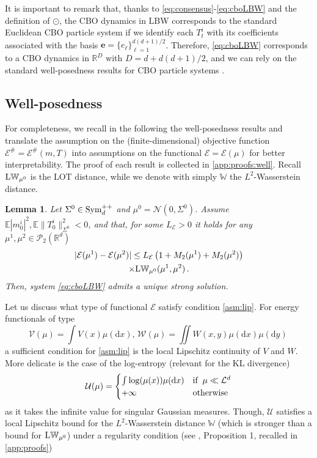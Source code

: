 \documentclass{article}
\theoremstyle{plain}
\newtheorem{lemma}[theorem]{Lemma}
\theoremstyle{definition}
\theoremstyle{remark}
\newcommand{\Rd}{ {\mathbb{R}^d}}
\newcommand{\R}{ \mathbb{R}}
\newcommand{\E}{\mathcal{E}}
\newcommand{\U}{\mathcal{U}}
\renewcommand{\d}{\mathrm{d}}
\newcommand{\pd}{\textup{Sym}^{++}_d}
\newcommand{\W}{\mathbb{W}}
\newcommand{\LW}{\textup{L}\mathbb{W}}
\begin{document}
It is important to remark that, thanks to \eqref{eq:consensus}-\eqref{eq:cboLBW} and the definition of $\odot$, the CBO dynamics in LBW corresponds to the standard Euclidean CBO particle system if we identify each $T^i_t$ with its coefficients associated with the basis $\bm{e} = \{e_\ell\}_{\ell = 1}^{d(d+1)/2}$. Therefore, \eqref{eq:cboLBW} corresponds to a CBO dynamics in $\R^D$ with $D = d + d(d+1)/2$, and we can rely on the standard well-posedness results for CBO particle systems \cite{carrillo2021consensus, carrillo2018analytical}. 


\subsection{Well-posedness}

For completeness, we recall in the following the well-posedness results  and translate the assumption on the (finite-dimensional) objective function $\E^\# = \E^\#(m,T)$ into assumptions on the functional $\E = \E(\mu)$ for better interpretability. The proof of each result is collected in \cref{app:proofs:well}. Recall $\LW_{\mu^0}$  is the LOT distance, while we denote with simply $\W$ the $L^2$-Wasserstein distance.
%


\begin{lemma} \label{l:well}
Let $\Sigma^0 \in \pd$ and $\mu^0 = \mathcal{N}(0, \Sigma^0)$. Assume $\mathbb{E}|m_0^i|^2,\mathbb{E}\|T_0^i\|_{\Sigma^0}^2 <0$, and that, for some $L_\E>0$ it holds for any $\mu^1, \mu^2 \in \mathcal{P}_2(\Rd)$
\begin{multline} \label{asm:lip}
|\E(\mu^1) - \E(\mu^2)| \leq L_\E \left(1 + M_2(\mu^1) + M_2(\mu^2)\right) \\\times  \LW_{\mu^0}(\mu^1, \mu^2)\,.
\end{multline}
Then, system \eqref{eq:cboLBW} admits a unique strong solution.
\end{lemma}


Let us discuss what type of functional $\E$ satisfy condition \eqref{asm:lip}.
For energy functionals of type 
\begin{equation}\label{eq:VW}
 \mathcal{V}(\mu) = \!\!\int \!V(x)\mu(\d x), \, \mathcal{W}(\mu) = \!\!\iint \!W(x,y)\mu(\d x)\mu(\d y)\,
\end{equation}
a sufficient condition for \eqref{asm:lip} is the local Lipschitz continuity of $V$ and $W$. More delicate is the case of the log-entropy (relevant for the KL divergence) 
\[\mathcal{U}(\mu)  = \begin{cases}
 \int \log(\mu(x)) \mu(\d x) & \textup{if} \;\; \mu \ll \mathcal{L}^d \\
 + \infty  &\textup{otherwise}
 \end{cases}
 \]
as it takes the infinite value for singular Gaussian measures. Though, $\U$ satisfies a local Lipschitz bound for the $L^2$-Wasserstein distance $\W$ (which is stronger than a bound for $\LW_{\mu^0}$)  under a regularity condition (see \citep{polyanskiy2016wasserstein}, Proposition 1, recalled in \cref{app:proofs})
\end{document}
